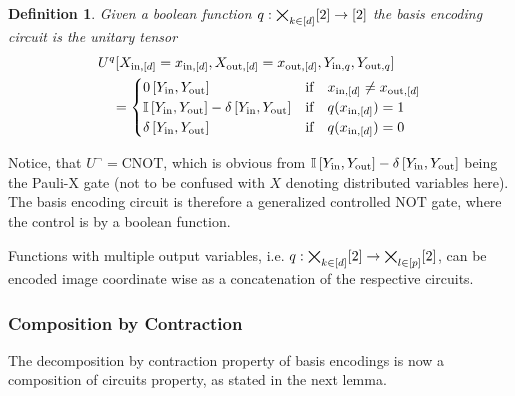 \documentclass[aps,onecolumn,nofootinbib,pra]{article}
\newtheorem{definition}{Definition}
\begin{document}
    \begin{definition}
        Given a boolean function $q:\bigtimes_{k\in[d]}[2]\rightarrow[2]$ the basis encoding circuit is the unitary tensor
        \begin{align*}
            &U^{q}[X_{\mathrm{in},[d]}=x_{\mathrm{in},[d]},X_{\mathrm{out},[d]}=x_{\mathrm{out},[d]},Y_{\mathrm{in},q},Y_{\mathrm{out},q}] \\
            &\quad=
            \begin{cases}
                0\left[Y_{\mathrm{in}},Y_{\mathrm{out}}\right]
                & \text{if}\quad x_{\mathrm{in},[d]}\neq x_{\mathrm{out},[d]} \\
                \mathbb{I}\left[Y_{\mathrm{in}},Y_{\mathrm{out}}\right] - \delta\left[Y_{\mathrm{in}},Y_{\mathrm{out}}\right]
                & \text{if}\quad q(x_{\mathrm{in},[d]}) = 1 \\
                \delta\left[Y_{\mathrm{in}},Y_{\mathrm{out}}\right]
                & \text{if}\quad q(x_{\mathrm{in},[d]}) = 0 \\
            \end{cases}
        \end{align*}
    \end{definition}

    Notice, that $U^{\lnot} = \mathrm{CNOT}$, which is obvious from $\mathbb{I}\left[Y_{\mathrm{in}},Y_{\mathrm{out}}\right] - \delta\left[Y_{\mathrm{in}},Y_{\mathrm{out}}\right]$ being the Pauli-X gate (not to be confused with $X$ denoting distributed variables here).
    The basis encoding circuit is therefore a generalized controlled $\mathrm{NOT}$ gate, where the control is by a boolean function.

    Functions with multiple output variables, i.e. $q:\bigtimes_{k\in[d]}[2]\rightarrow\bigtimes_{l\in[p]}[2]$, can be encoded image coordinate wise as a concatenation of the respective circuits.

    \subsubsection{Composition by Contraction}

    The decomposition by contraction property of basis encodings is now a composition of circuits property, as stated in the next lemma.
\end{document}
